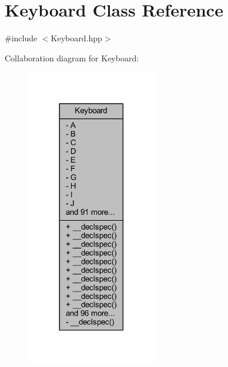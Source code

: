 \hypertarget{class_keyboard}{\section{Keyboard Class Reference}
\label{class_keyboard}
}


{\ttfamily \#include $<$Keyboard.\-hpp$>$}



Collaboration diagram for Keyboard\-:\nopagebreak
\begin{figure}[H]
\begin{center}
\leavevmode
\includegraphics[width=161pt]{class_keyboard__coll__graph}
\end{center}
\end{figure}
